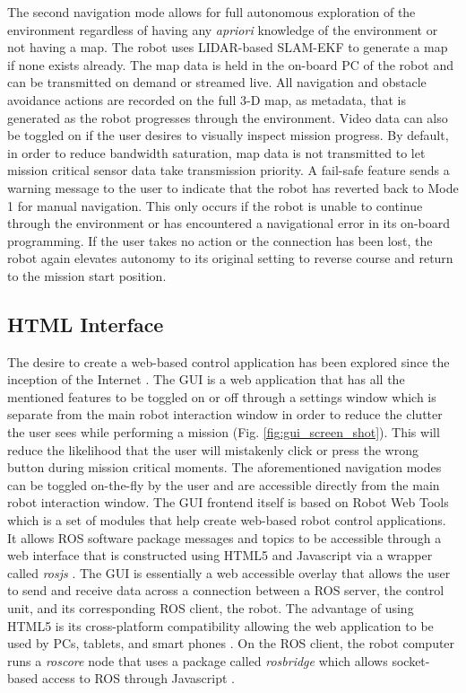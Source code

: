 The second navigation mode allows for full autonomous exploration of the environment regardless of having any \emph{apriori} knowledge of the environment or not having a map. The robot uses LIDAR-based SLAM-EKF \cite{weingarten2005ekf, castellanos2007robocentric} to generate a map if none exists already. The map data is held in the on-board PC of the robot and can be transmitted on demand or streamed live. All navigation and obstacle avoidance actions are recorded on the full 3-D map, as metadata, that is generated as the robot progresses through the environment. Video data can also be toggled on if the user desires to visually inspect mission progress. By default, in order to reduce bandwidth saturation, map data is not transmitted to let mission critical sensor data take transmission priority.  A fail-safe feature sends a warning message to the user to indicate that the robot has reverted back to Mode 1 for manual navigation. This only occurs if the robot is unable to continue through the environment or has encountered a navigational error in its on-board programming. If the user takes no action or the connection has been lost, the robot again elevates autonomy to its original setting to reverse course and return to the mission start position. 

\subsection{HTML Interface}

The desire to create a web-based control application has been explored since the inception of the Internet \cite{goldberg2002beyond}. The GUI is a web application that has all the mentioned features to be toggled on or off through a settings window which is separate from the main robot interaction window in order to reduce the clutter the user sees while performing a mission (Fig. \ref{fig:gui_screen_shot}). This will reduce the likelihood that the user will mistakenly click or press the wrong button during mission critical moments. The aforementioned navigation modes can be toggled on-the-fly by the user and are accessible directly from the main robot interaction window. The GUI frontend itself is based on Robot Web Tools \cite{webtools,lee2012web} which is a set of modules that help create web-based robot control applications. It allows ROS software package messages and topics to be accessible through a web interface that is constructed using HTML5 and Javascript via a wrapper called \textit{rosjs} \cite{osentoski2011robots}. The GUI is essentially a web accessible overlay that allows the user to send and receive data across a connection between a ROS server, the control unit, and its corresponding ROS client, the robot. The advantage of using HTML5 is its cross-platform compatibility allowing the web application to be used by PCs, tablets, and smart phones \cite{hilton2014lightweight}. On the ROS client, the robot computer runs a \textit{roscore} node that uses a package called \textit{rosbridge} which allows socket-based access to ROS through Javascript \cite{crick2011rosbridge}.

